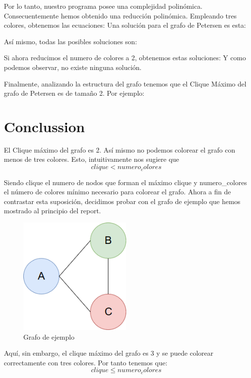 \documentclass{article}
\begin{document}
    Por lo tanto, nuestro programa posee una complejidad polinómica. Consecuentemente hemos obtenido una reducción polinómica.
    Empleando tres colores, obtenemos las ecuaciones: 
    Una solución para el grafo de Petersen es esta: 

    Así mismo, todas las posibles soluciones son: 
    
    Si ahora reducimos el numero de colores a 2, obtenemos estas soluciones:
    Y como podemos observar, no existe ninguna solución.

    Finalmente, analizando la estructura del grafo tenemos que el Clique Máximo del grafo de Petersen es de tamaño 2. Por ejemplo: 

\section{Conclussion}
El Clique máximo del grafo es 2. Así mismo no podemos colorear el grafo con menos de tres colores. Esto, intuitivamente nos sugiere que 
    \[clique < numero_colores\]

Siendo clique el numero de nodos que forman el máximo clique y numero\_colores el número 
de colores mínimo necesario para colorear el grafo. Ahora a 
fin de contrastar esta suposición, decidimos probar con el grafo de ejemplo que hemos mostrado al principio del report. 
\begin{figure}[H]
    \centering
    \includegraphics[width=0.5\textwidth]{pictures/ejemplo.png}
    \caption{Grafo de ejemplo}
\end{figure}

Aquí, sin embargo, el clique máximo del grafo es 3 y se puede colorear correctamente con tres colores. Por tanto tenemos que:
    \[clique \leq numero_colores\]
    
\end{document}
